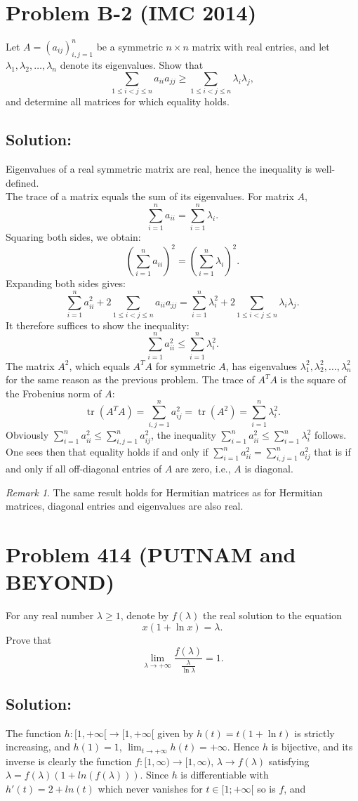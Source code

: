 \documentclass[11pt, a4paper, oneside]{article}
\newcommand{\problem}[1][]{\section{#1} \hfill \par}
\newcommand{\solution}[1][]{\subsection*{#1}\hfill \par}
\theoremstyle{remark}
\newtheorem*{remark}{Remark}
\theoremstyle{lemma}
\begin{document}
\newpage
\problem[Problem B-2 (IMC 2014)]
Let \( A = (a_{ij})_{i,j=1}^{n} \) be a symmetric \( n \times n \) matrix with real entries, and let \( \lambda_{1}, \lambda_{2}, \ldots, \lambda_{n} \) denote its eigenvalues. Show that
\[
\sum_{1 \leq i < j \leq n} a_{ii} a_{jj} \geq \sum_{1 \leq i < j \leq n} \lambda_{i} \lambda_{j},
\]
and determine all matrices for which equality holds.

\solution[Solution:]
Eigenvalues of a real symmetric matrix are real, hence the inequality is well-defined.
\\
The trace of a matrix equals the sum of its eigenvalues. For matrix \( A \),
\[
\sum_{i=1}^{n} a_{ii} = \sum_{i=1}^{n} \lambda_{i}.
\]
Squaring both sides, we obtain:
\[
\left( \sum_{i=1}^{n} a_{ii} \right)^2 = \left( \sum_{i=1}^{n} \lambda_{i} \right)^2.
\]
Expanding both sides gives:
\[
\sum_{i=1}^{n} a_{ii}^2 + 2 \sum_{1 \leq i < j \leq n} a_{ii} a_{jj} = \sum_{i=1}^{n} \lambda_{i}^2 + 2 \sum_{1 \leq i < j \leq n} \lambda_{i} \lambda_{j}.
\]
It therefore suffices to show the inequality:
\[
\sum_{i=1}^{n} a_{ii}^2 \leq \sum_{i=1}^{n} \lambda_{i}^2.
\]
The matrix \( A^2 \), which equals \( A^T A \) for symmetric \( A \), has eigenvalues \( \lambda_{1}^2, \lambda_{2}^2, \ldots, \lambda_{n}^2 \) for the same reason as the previous problem. The trace of \( A^T A \) is the square of the Frobenius norm of \( A \):
\[
\operatorname{tr}\left(A^T A\right) = \sum_{i,j=1}^{n} a_{ij}^2 = \operatorname{tr}\left(A^2\right) = \sum_{i=1}^{n} \lambda_{i}^2.
\]
Obviously \( \sum_{i=1}^{n} a_{ii}^2 \leq \sum_{i,j=1}^{n} a_{ij}^2 \), the inequality \( \sum_{i=1}^{n} a_{ii}^2 \leq \sum_{i=1}^{n} \lambda_{i}^2 \) follows. One sees then that equality holds if and only if $\sum_{i=1}^{n} a_{ii}^2 = \sum_{i,j=1}^{n} a_{ij}^2$ that is if and only if all off-diagonal entries of \( A \) are zero, i.e., \( A \) is diagonal.
\begin{remark}
The same result holds for Hermitian matrices as for Hermitian matrices, diagonal entries and eigenvalues are also real. 
\end{remark}
\newpage
\problem[Problem 414 (PUTNAM and BEYOND)]
For any real number $\lambda \geq 1$, denote by $f(\lambda)$ the real solution to the equation
\[
x(1 + \ln x) = \lambda.
\]
Prove that
\[
\lim_{\lambda \to +\infty} \frac{f(\lambda)}{\frac{\lambda}{\ln \lambda}} = 1.
\]
\solution[Solution:]
The function \( h : [1, +\infty[ \rightarrow [1, +\infty[\) given by \( h(t) = t(1 + \ln t) \) is strictly increasing, and \( h(1) = 1 \), \(\lim_{t \to +\infty} h(t) = +\infty\). Hence \( h \) is bijective, and its inverse is clearly the function \( f : [1, \infty) \rightarrow [1, \infty) \), \( \lambda \rightarrow f(\lambda) \) satisfying $\lambda=f(\lambda)(1+ln(f(\lambda)))$. Since \( h \) is differentiable with $h'(t)=2+ln(t)$ which never vanishes for $t\in[1; +\infty[$ so is \( f \), and
\end{document}
